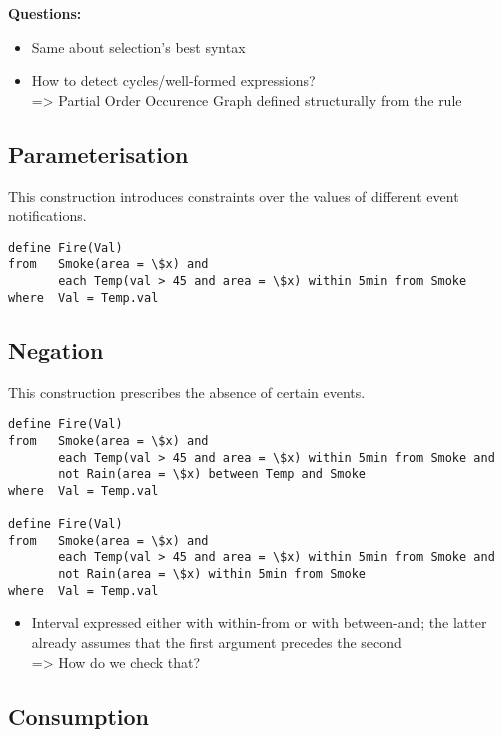 \medskip
\noindent
\textbf{Questions:}
\begin{itemize}
	\item Same about selection's best syntax
	\item How to detect cycles/well-formed expressions?\\
			=> Partial Order Occurence Graph defined structurally from the rule
\end{itemize}

\subsection{Parameterisation}
\label{sec:Parameterisation}

This construction introduces constraints over the values of different event notifications.

\begin{lstlisting}[language=iotdsl]
define Fire(Val)
from   Smoke(area = \$x) and
       each Temp(val > 45 and area = \$x) within 5min from Smoke
where  Val = Temp.val
\end{lstlisting}


\subsection{Negation}
\label{sec:Negation}

This construction prescribes the absence of certain events.

\begin{lstlisting}[language=iotdsl]
define Fire(Val)
from   Smoke(area = \$x) and
       each Temp(val > 45 and area = \$x) within 5min from Smoke and
       not Rain(area = \$x) between Temp and Smoke
where  Val = Temp.val

define Fire(Val)
from   Smoke(area = \$x) and
       each Temp(val > 45 and area = \$x) within 5min from Smoke and
       not Rain(area = \$x) within 5min from Smoke
where  Val = Temp.val
\end{lstlisting}

\begin{itemize}
	\item Interval expressed either with within-from or with between-and; the
latter already assumes that the first argument precedes the second\\
=> How do we check that?
\end{itemize}

\subsection{Consumption}
\label{sec:Consumption}

